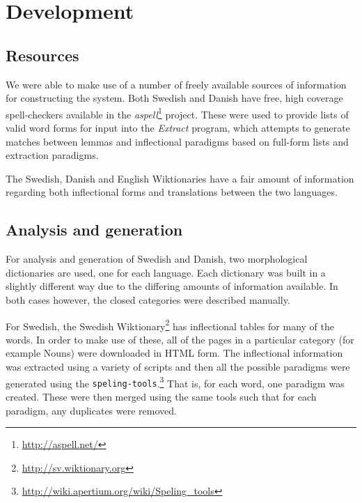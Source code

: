 \documentclass[11pt]{article}
\begin{document}
\section{Development}

\subsection{Resources}


We were able to make use of a number of freely available sources of information for 
constructing the system. Both Swedish and Danish have free, high coverage spell-checkers
available in the \emph{aspell}\footnote{\url{http://aspell.net/}} project. These were used
to provide lists of valid word forms for input into the \emph{Extract} \citep{Forsberg2006} 
program, which attempts to generate matches between lemmas and inflectional paradigms
based on full-form lists and extraction paradigms. 

The Swedish, Danish and English Wiktionaries have a fair amount of information regarding
both inflectional forms and translations between the two languages. 

\subsection{Analysis and generation}


For analysis and generation of Swedish and Danish, two morphological dictionaries
are used, one for each language. Each dictionary was built in a slightly 
different way due to the differing amounts of information available. In both
cases however, the closed categories were described manually. 

For Swedish, the Swedish Wiktionary\footnote{\url{http://sv.wiktionary.org}} has
inflectional tables for many of the words. In order to make use of these, all of 
the pages in a particular category (for example Nouns) were downloaded in HTML
form. The inflectional information was extracted using a variety of scripts and 
then all the possible paradigms were generated using the {\tt\small speling-tools}.\footnote{\url{http://wiki.apertium.org/wiki/Speling_tools}}
That is, for each word, one paradigm was created. These were then merged using
the same tools such that for each paradigm, any duplicates were removed. %
\end{document}

